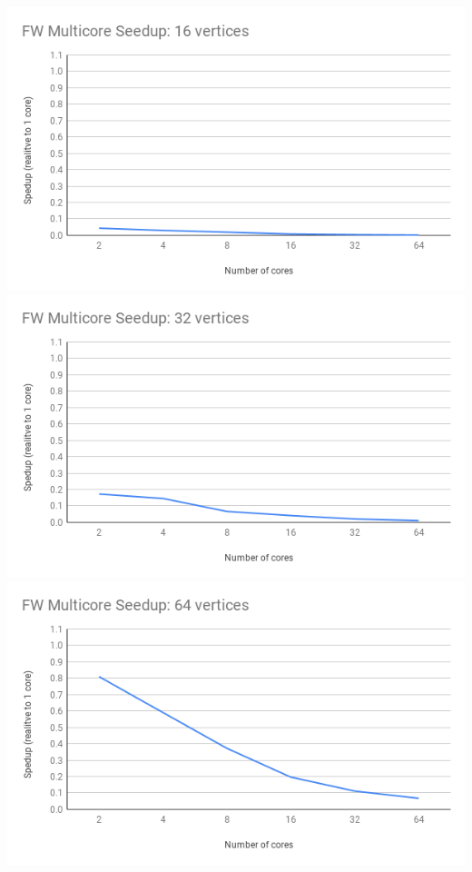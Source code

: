 \documentclass[]{article}
\begin{document}
		\includegraphics[scale=0.5]{graphs/exp2_16.png}\\
		\includegraphics[scale=0.5]{graphs/exp2_32.png}\\
		\includegraphics[scale=0.5]{graphs/exp2_64.png}\\
\end{document}

